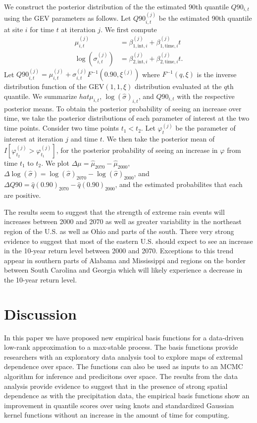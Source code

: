 \documentclass[aoas]{imsart}
\begin{document}
We construct the posterior distribution of the the estimated 90th quantile $Q90_{i, t}$ using the GEV parameters as follows.
Let $Q90_{i, t}^{(j)}$ be the estimated 90th quantile at site $i$ for time $t$ at iteration $j$.
We first compute
\begin{align}
  \mu_{i, t}^{(j)} &= \beta_{1, \text{int}, i}^{(j)} + \beta_{1, \text{time}, i}^{(j)} t \\
  \log\left(\sigma_{i, t}^{(j)}\right) &= \beta_{2, \text{int}, i}^{(j)} + \beta_{2, \text{time}, i}^{(j)} t. \nonumber
\end{align}
Let $Q90_{i, t}^{(j)} = \mu_{i, t}^{(j)} + \sigma_{i, t}^{(j)} F^{-1}\left(0.90, \xi^{(j)}\right)$ where $F^{-1}(q, \xi)$ is the inverse distribution function of the GEV$(1, 1, \xi)$ distribution evaluated at the $q$th quantile.
We summarize $hat{\mu}_{i, t}$, $\log(\hat{\sigma})_{i, t}$, and $Q90_{i, t}$ with the respective posterior means.
To obtain the posterior probability of seeing an increase over time, we take the posterior distributions of each parameter of interest at the two time points.
Consider two time points $t_1 < t_2$.
Let $\varphi_t^{(j)}$ be the parameter of interest at iteration $j$ and time $t$.
We then take the posterior mean of $I\left[\varphi_{t_2}^{(j)} > \varphi_{t_1}^{(j)}\right]$, for the posterior probability of seeing an increase in $\varphi$ from time $t_1$ to $t_2$.
We plot \mbox{$\Delta \mu = \hat{\mu}_{2070} - \hat{\mu}_{2000}$}, \mbox{$\Delta \log(\hat{\sigma}) = \log(\hat{\sigma})_{2070} - \log(\hat{\sigma})_{2000}$}, and \mbox{$\Delta Q90 = \hat{q}(0.90)_{2070} - \hat{q}(0.90)_{2000}$}, and the estimated probabilites that each are positive.

The results seem to suggest that the strength of extreme rain events will increases between 2000 and 2070 as well as greater variability in the northeast region of the U.S. as well as Ohio and parts of the south.
There very strong evidence to suggest that most of the eastern U.S. should expect to see an increase in the 10-year return level between 2000 and 2070.
Exceptions to this trend appear in southern parts of Alabama and Mississippi and regions on the border between South Carolina and Georgia which will likely experience a decrease in the 10-year return level.

\section{Discussion}\label{ebs:con}

In this paper we have proposed new empirical basis functions for a data-driven low-rank approximation to a max-stable process.
The basis functions provide researchers with an exploratory data analysis tool to explore maps of extremal dependence over space.
The functions can also be used as inputs to an MCMC algorithm for inference and predicitons over space.
The results from the data analysis provide evidence to suggest that in the presence of strong spatial dependence as with the precipitation data, the empirical basis functions show an improvement in quantile scores over using knots and standardized Gaussian kernel functions without an increase in the amount of time for computing.
\end{document}
